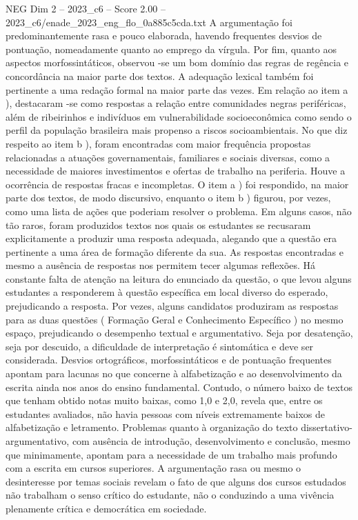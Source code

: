 \begin{textsample}{NEG Dim 2 – 2023\_c6 – Score 2.00 – 2023\_c6/enade\_2023\_eng\_flo\_0a885c5cda.txt}
A argumentação foi predominantemente rasa e pouco elaborada, havendo frequentes desvios de pontuação, nomeadamente quanto ao emprego da vírgula.
Por fim, quanto aos aspectos morfossintáticos, observou -se um bom domínio das regras de regência e concordância na maior parte dos textos.
A adequação lexical também foi pertinente a uma redação formal na maior parte das vezes.
Em relação ao item a ), destacaram -se como respostas a relação entre comunidades negras periféricas, além de ribeirinhos e indivíduos em vulnerabilidade socioeconômica como sendo o perfil da população brasileira mais propenso a riscos socioambientais.
No que diz respeito ao item b ), foram encontradas com maior frequência propostas relacionadas a atuações governamentais, familiares e sociais diversas, como a necessidade de maiores investimentos e ofertas de trabalho na periferia.
Houve a ocorrência de respostas fracas e incompletas.
O item a ) foi respondido, na maior parte dos textos, de modo discursivo, enquanto o item b ) figurou, por vezes, como uma lista de ações que poderiam resolver o problema.
Em alguns casos, não tão raros, foram produzidos textos nos quais os estudantes se recusaram explicitamente a produzir uma resposta adequada, alegando que a questão era pertinente a uma área de formação diferente da sua.
As respostas encontradas e mesmo a ausência de respostas nos permitem tecer algumas reflexões.
Há constante falta de atenção na leitura do enunciado da questão, o que levou alguns estudantes a responderem à questão específica em local diverso do esperado, prejudicando a resposta.
Por vezes, alguns candidatos produziram as respostas para as duas questões ( Formação Geral e Conhecimento Específico ) no mesmo espaço, prejudicando o desempenho textual e argumentativo.
Seja por desatenção, seja por descuido, a dificuldade de interpretação é sintomática e deve ser considerada.
Desvios ortográficos, morfossintáticos e de pontuação frequentes apontam para lacunas no que concerne à alfabetização e ao desenvolvimento da escrita ainda nos anos do ensino fundamental.
Contudo, o número baixo de textos que tenham obtido notas muito baixas, como 1,0 e 2,0, revela que, entre os estudantes avaliados, não havia pessoas com níveis extremamente baixos de alfabetização e letramento.
Problemas quanto à organização do texto dissertativo-argumentativo, com ausência de introdução, desenvolvimento e conclusão, mesmo que minimamente, apontam para a necessidade de um trabalho mais profundo com a escrita em cursos superiores.
A argumentação rasa ou mesmo o desinteresse por temas sociais revelam o fato de que alguns dos cursos estudados não trabalham o senso crítico do estudante, não o conduzindo a uma vivência plenamente crítica e democrática em sociedade.

\end{textsample}
